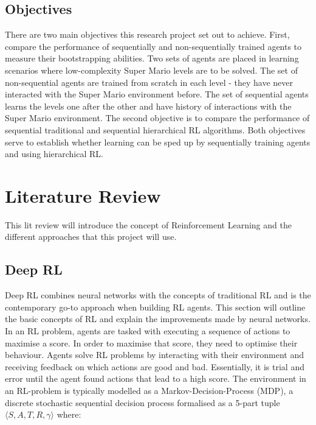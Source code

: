 \documentclass[notitlepage,a4paper,11pt]{article}
\begin{document}
\subsection{Objectives}
There are two main objectives this research project set out to achieve. First, compare the performance of sequentially and non-sequentially trained agents to measure their bootstrapping abilities. Two sets of agents are placed in learning scenarios where low-complexity Super Mario levels are to be solved. The set of non-sequential agents are trained from scratch in each level - they have never interacted with the Super Mario environment before. The set of sequential agents learns the levels one after the other and have history of interactions with the Super Mario environment. The second objective is to compare the performance of sequential traditional and sequential hierarchical RL algorithms. Both objectives serve to establish whether learning can be sped up by sequentially training agents and using hierarchical RL.

\section{Literature Review}
This lit review will introduce the concept of Reinforcement Learning and the different approaches that this project will use.


\subsection{Deep RL}\label{deep_rl}
Deep RL combines neural networks with the concepts of traditional RL and is the contemporary go-to approach when building RL agents. This section will outline the basic concepts of RL and explain the improvements made by neural networks. In an RL problem, agents are tasked with executing a sequence of actions to maximise a score. In order to maximise that score, they need to optimise their behaviour. Agents solve RL problems by interacting with their environment and receiving feedback on which actions are good and bad. Essentially, it is trial and error until the agent found actions that lead to a high score. The environment in an RL-problem is typically modelled as a Markov-Decision-Process (MDP), a discrete stochastic sequential decision process \cite{puterman2014markov} formalised as a 5-part tuple $\langle S, A, T, R, \gamma \rangle$ where:
\end{document}
